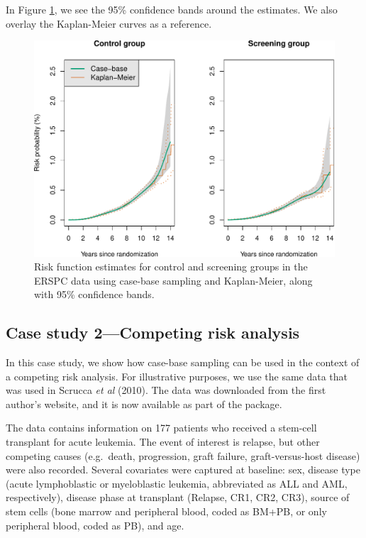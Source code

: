In Figure \ref{fig:erspc-cif-conf}, we see the 95\% confidence bands around the estimates.
We also overlay the Kaplan-Meier curves as a reference.

\begin{figure}[ht]
\includegraphics[width=\textwidth,keepaspectratio=true]{./erspc-cif-conf-1} \caption{Risk function estimates for control and screening groups in the ERSPC data using case-base sampling and Kaplan-Meier, along with 95\% confidence bands.}\label{fig:erspc-cif-conf}
\end{figure}

\hypertarget{case-study-2competing-risk-analysis}{%
\subsection{Case study 2---Competing risk analysis}\label{case-study-2competing-risk-analysis}}

In this case study, we show how case-base sampling can be used in the context of a competing risk analysis. For illustrative purposes, we use the same data that was used in Scrucca \emph{et al} (2010). The data was downloaded from the first author's website, and it is now available as part of the  package.

The data contains information on 177 patients who received a stem-cell transplant for acute leukemia. The event of interest is relapse, but other competing causes (e.g.~death, progression, graft failure, graft-versus-host disease) were also recorded. Several covariates were captured at baseline: sex, disease type (acute lymphoblastic or myeloblastic leukemia, abbreviated as ALL and AML, respectively), disease phase at transplant (Relapse, CR1, CR2, CR3), source of stem cells (bone marrow and peripheral blood, coded as BM+PB, or only peripheral blood, coded as PB), and age.

